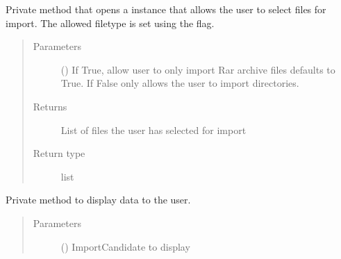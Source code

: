\documentclass[letterpaper,10pt,english]{sphinxmanual}
\begin{document}
\begin{fulllineitems}
\begin{fulllineitems}
\end{fulllineitems}


\begin{fulllineitems}
\label{\detokenize{polo.windows:polo.windows.run_importer.RunImporterDialog._open_browser}}
Private method that opens a  instance that allows the 
user to select files for import. 
The allowed filetype is set using the  flag.
\begin{quote}\begin{description}
\item[{Parameters}] \leavevmode
{} (\sphinxstyleliteralemphasis{\sphinxupquote{, }}) \textendash{} If True, allow user to only import Rar archive files 
defaults to True. If False
only allows the user to import directories.

\item[{Returns}] \leavevmode
List of files the user has selected for import

\item[{Return type}] \leavevmode
list

\end{description}\end{quote}

\end{fulllineitems}


\begin{fulllineitems}
\label{\detokenize{polo.windows:polo.windows.run_importer.RunImporterDialog._populate_fields}}
Private method to display {\hyperref[\detokenize{polo.windows:polo.windows.run_importer.ImportCandidate}]{}} 
data to the user.
\begin{quote}\begin{description}
\item[{Parameters}] \leavevmode
{} ({\hyperref[\detokenize{polo.windows:polo.windows.run_importer.ImportCandidate}]{}}) \textendash{} ImportCandidate to display


\end{description}
\end{quote}
\end{fulllineitems}
\end{fulllineitems}
\end{document}
